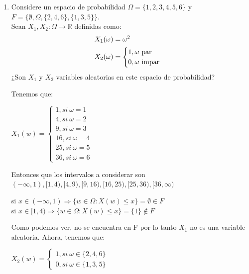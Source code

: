 \documentclass[12pt,a4paper]{report}
\begin{document}
\begin{enumerate}
{		}
		
		\item {
			Considere un espacio de probabilidad $\Omega = \{1, 2, 3, 4, 5, 6\}$ y
			$F = \{\emptyset, \Omega, \{2, 4, 6\}, \{1, 3, 5\}\}$.\\
			Sean $X_1, X_2 : \Omega \rightarrow \mathbb{R}$ definidas como:
			\begin{align*}
				X_1(\omega) &= \omega^2\\
				X_2(\omega) &= \begin{cases}																						1, \omega $ par$\\																			0, \omega $ impar$																			\end{cases}
			\end{align*}
			¿Son $X_1$ y $X_2$ variables aleatorias en este espacio de probabilidad?
			
			Tenemos que: \\
			\begin{center}
			    $X_{1}(w)= \begin{cases} 1, si\ \omega=1\\ 4,si \ \omega=2 \\ 9, si \ \omega=3\\ 16, si \ \omega=4 \\ 25, si \ \omega=5 \\ 36, si \ \omega=6  \end{cases}$
			\end{center}
			Entonces que los intervalos a considerar son $(-\infty,1),[1,4),[4,9),[9,16),[16,25),[25,36),[36,\infty)$\\
			\begin{center}
			    si $x\in (-\infty,1) \Rightarrow \lbrace w\in \Omega : X(w)\leq x \rbrace = \emptyset \in F $ \\ 
			    si $x\in [1,4) \Rightarrow \lbrace w \in \Omega : X(w) \leq x \rbrace = \lbrace 1 \rbrace \notin F$
			\end{center}
			Como podemos ver, no se encuentra en F por lo tanto  $X_{1}$ no es una variable aleatoria. Ahora, tenemos que:\\
			\begin{center}
			    $X_{2}(w) = \begin{cases}
			    1, si \ \omega \in \lbrace 2,4,6 \rbrace \\
			    0, si \ \omega \in \lbrace 1,3,5 \rbrace 
			    \end{cases}$
			\end{center}
	
}
\end{enumerate}
\end{document}
